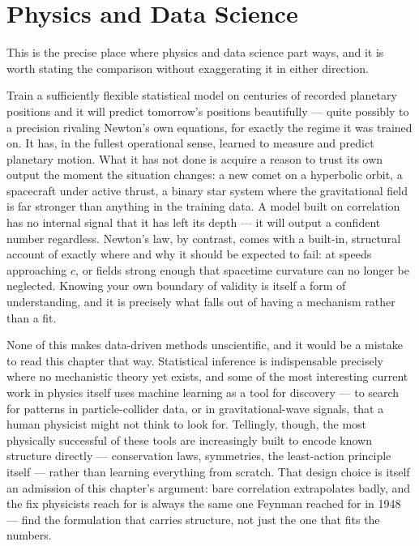\section{Physics and Data Science}
\label{pd:pds}

This is the precise place where physics and data science part ways, and it is
worth stating the comparison without exaggerating it in either direction.

Train a sufficiently flexible statistical model on centuries of recorded
planetary positions and it will predict tomorrow's positions beautifully ---
quite possibly to a precision rivaling Newton's own equations, for exactly the
regime it was trained on. It has, in the fullest operational sense, learned to
measure and predict planetary motion. What it has not done is acquire a reason
to trust its own output the moment the situation changes: a new comet on a
hyperbolic orbit, a spacecraft under active thrust, a binary star system where
the gravitational field is far stronger than anything in the training data. A
model built on correlation has no internal signal that it has left its depth
--- it will output a confident number regardless. Newton's law, by contrast,
comes with a built-in, structural account of exactly where and why it should be
expected to fail: at speeds approaching $c$, or fields strong enough that
spacetime curvature can no longer be neglected. Knowing your own boundary of
validity is itself a form of understanding, and it is precisely what falls out
of having a mechanism rather than a fit.

None of this makes data-driven methods unscientific, and it would be a mistake
to read this chapter that way. Statistical inference is indispensable precisely
where no mechanistic theory yet exists, and some of the most interesting
current work in physics itself uses machine learning as a tool for discovery
--- to search for patterns in particle-collider data, or in gravitational-wave
signals, that a human physicist might not think to look for. Tellingly, though,
the most physically successful of these tools are increasingly built to encode
known structure directly --- conservation laws, symmetries, the least-action
principle itself --- rather than learning everything from scratch. That design
choice is itself an admission of this chapter's argument: bare correlation
extrapolates badly, and the fix physicists reach for is always the same one
Feynman reached for in 1948 --- find the formulation that carries structure,
not just the one that fits the numbers.


